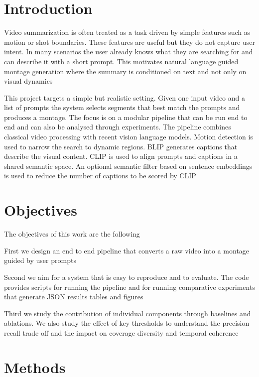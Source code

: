 \documentclass[conference,compsoc]{IEEEtran}
\begin{document}
\IEEEpeerreviewmaketitle

\section{Introduction}
Video summarization is often treated as a task driven by simple features such as motion or shot boundaries. These features are useful but they do not capture user intent. In many scenarios the user already knows what they are searching for and can describe it with a short prompt. This motivates natural language guided montage generation where the summary is conditioned on text and not only on visual dynamics

This project targets a simple but realistic setting. Given one input video and a list of prompts the system selects segments that best match the prompts and produces a montage. The focus is on a modular pipeline that can be run end to end and can also be analysed through experiments. The pipeline combines classical video processing with recent vision language models. Motion detection is used to narrow the search to dynamic regions. BLIP generates captions that describe the visual content. CLIP is used to align prompts and captions in a shared semantic space. An optional semantic filter based on sentence embeddings is used to reduce the number of captions to be scored by CLIP

\section{Objectives}
The objectives of this work are the following

First we design an end to end pipeline that converts a raw video into a montage guided by user prompts

Second we aim for a system that is easy to reproduce and to evaluate. The code provides scripts for running the pipeline and for running comparative experiments that generate JSON results tables and figures

Third we study the contribution of individual components through baselines and ablations. We also study the effect of key thresholds to understand the precision recall trade off and the impact on coverage diversity and temporal coherence

\section{Methods}
\end{document}

